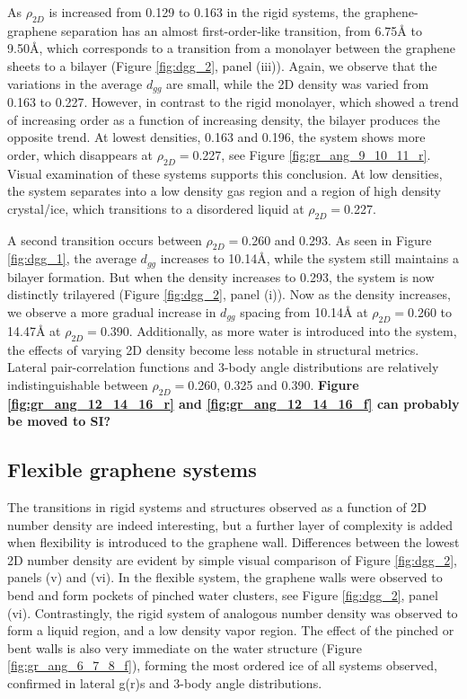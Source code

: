 \documentclass[12pt]{article}
\begin{document}
As \(\rho_{2D}\) is increased from 0.129 to 0.163 in the rigid systems, the graphene-graphene separation has an almost first-order-like transition, from 6.75\r A to 9.50\r A, which corresponds to a transition from a monolayer between the graphene sheets to a bilayer (Figure \ref{fig:dgg_2}, panel (iii)). Again, we observe that the variations in the average \(d_{gg}\) are small, while the 2D density was varied from 0.163 to 0.227. However, in contrast to the rigid monolayer, which showed a trend of increasing order as a function of increasing density, the bilayer produces the opposite trend. At lowest densities, 0.163 and 0.196, the system shows more order, which disappears at \(\rho_{2D}=\)0.227, see Figure \ref{fig:gr_ang_9_10_11_r}. Visual examination of these systems supports this conclusion. At low densities, the system separates into a low density gas region and a region of high density crystal/ice, which transitions to a disordered liquid at \(\rho_{2D}=\)0.227.

A second transition occurs between \(\rho_{2D}=\)0.260 and 0.293. As seen in Figure \ref{fig:dgg_1}, the average \(d_{gg}\) increases to 10.14\r A, while the system still maintains a bilayer formation. But when the density increases to 0.293, the system is now distinctly trilayered (Figure \ref{fig:dgg_2}, panel (i)). Now as the density increases, we observe a more gradual increase in \(d_{gg}\) spacing from 10.14\r A at \(\rho_{2D}=\)0.260 to 14.47\r A at \(\rho_{2D}=\)0.390. Additionally, as more water is introduced into the system, the effects of varying 2D density become less notable in structural metrics. Lateral pair-correlation functions and 3-body angle distributions are relatively indistinguishable between \(\rho_{2D}=\)0.260, 0.325 and 0.390. \textbf{\color{red} Figure \ref{fig:gr_ang_12_14_16_r} and \ref{fig:gr_ang_12_14_16_f} can probably be moved to SI?}

\subsection*{Flexible graphene systems}

The transitions in rigid systems and structures observed as a function of 2D number density are indeed interesting, but a further layer of complexity is added when flexibility is introduced to the graphene wall. Differences between the lowest 2D number density are evident by simple visual comparison of Figure \ref{fig:dgg_2}, panels (v) and (vi). In the flexible system, the graphene walls were observed to bend and form pockets of pinched water clusters, see Figure \ref{fig:dgg_2}, panel (vi). Contrastingly, the rigid system of analogous number density was observed to form a liquid region, and a low density vapor region. The effect of the pinched or bent walls is also very immediate on the water structure (Figure \ref{fig:gr_ang_6_7_8_f}), forming the most ordered ice of all systems observed, confirmed in lateral g(r)s and 3-body angle distributions.
\end{document}
